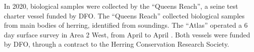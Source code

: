 In 2020, biological samples were collected by the ``Queens Reach'', a seine test charter vessel funded by DFO.
The ``Queens Reach'' collected biological samples from main bodies of herring, identified from soundings.
The ``Atlas'' operated a 6 day surface survey in Area 2 West, from April  to April .
Both vessels were funded by DFO, through a contract to the Herring Conservation Research Society.